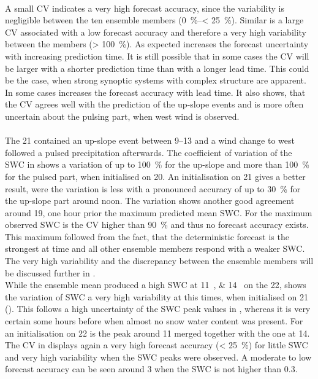\\
A small CV indicates a very high forecast accuracy, since the variability is negligible between the ten ensemble members (\SIrange{0}{< 25}{\percent}). Similar is a large CV associated with a low forecast accuracy and therefore a very high variability between the members (\SI{> 100}{\percent}). As expected increases the forecast uncertainty with increasing prediction time. It is still possible that in some cases the CV will be larger with a shorter prediction time than with a longer lead time. This could be the case, when strong synoptic systems with complex structure are apparent.
\\
In some cases increases the forecast accuracy with lead time. It also shows, that the CV agrees well with the prediction of the up-slope events and is more often uncertain about the pulsing part, when west wind is observed. 
\\
\\
The \SI{21}{\dec} contained an up-slope event between \SIrange{9}{13}{\UTC} and a wind change to west followed a pulsed precipitation afterwards. The coefficient of variation of the SWC in  shows a variation of up to \SI{100}{\percent} for the up-slope and more than \SI{100}{\percent} for the pulsed part, when initialised on \SI{20}{\dec}. An initialisation on \SI{21}{\dec} gives a better result, were the variation is less with a pronounced accuracy of up to \SI{30}{\percent} for the up-slope part around noon. 
The variation shows another good agreement around \SI{19}{\UTC}, one hour prior the maximum predicted mean SWC. For the maximum observed SWC is the CV higher than \SI{90}{\percent} and thus no forecast accuracy exists. This maximum followed from the fact, that the deterministic forecast is the strongest at time and all other ensemble members respond with a weaker SWC. The very high variability and the discrepancy between the ensemble members will be discussed further in .
\\
While the ensemble mean produced a high SWC at \SIlist{11;14}{\UTC} on the \SI{22}{\dec}, shows the variation of SWC a very high variability at this times, when initialised on \SI{21}{\dec} (). This follows a high uncertainty of the SWC peak values in , whereas it is very certain some hours before when almost no snow water content was present. 
For an initialisation on \SI{22}{\dec} is the peak around \SI{11}{\UTC} merged together with the one at \SI{14}{\UTC}. The CV in  displays again a very high forecast accuracy (\SI{< 25}{\percent}) for little SWC and very high variability when the SWC peaks were observed. A moderate to low forecast accuracy can be seen around \SI{3}{\UTC} when the SWC is not higher than \SI{0.3}{\SWC}. 
